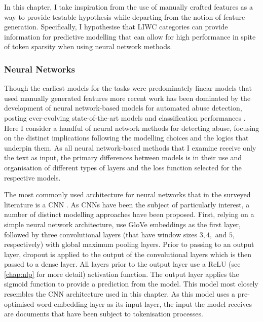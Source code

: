 In this chapter, I take inspiration from the use of manually crafted features as a way to provide testable hypothesis while departing from the notion of feature generation.  
Specifically, I hypothesise that LIWC categories can provide information for predictive modelling that can allow for high performance in spite of token sparsity when using neural network methods.  
  
\subsubsection{Neural Networks}\label{sec:LIWC_nn}  
Though the earliest models for the tasks were predominately linear models that used manually generated features \citep{Waseem-Hovy:2016,Davidson:2017,Warner:2012} more recent work has been dominated by the development of neural network-based models for automated abuse detection, posting ever-evolving state-of-the-art models and classification performances \citep[e.g.]{Park:2017,Badjatiya:2017,Zimmerman:2018,Stoop:2019,Isaksen:2020}.  
Here I consider a handful of neural network methods for detecting abuse, focusing on the distinct implications following the modelling choices and the logics that underpin them.  
As all neural network-based methods that I examine receive only the text as input, the primary differences between  models is in their use and organisation of different types of layers and the loss function selected for the respective models.  
  
The most commonly used architecture for neural networks that in the surveyed literature is a CNN \citep{Park:2017,Gamback:2017,Wulczyn:2017,Kolhatkar:2020,Zimmerman:2018,Wang:2020}.  
As CNNs have been the subject of particularly interest, a number of distinct modelling approaches have been proposed.  
First, relying on a simple neural network architecture, \citet{Kolhatkar:2020} use GloVe embeddings as the first layer, followed by three convolutional layers (that have window sizes $3, 4,$ and $5$, respectively) with global maximum pooling layers.  
Prior to passing  to an output layer,  dropout  is applied to the output of the convolutional layers which is then passed to a dense layer.  
All layers prior to the output layer use a ReLU (see \cref{chap:nlp} for more detail) activation function.  
The output layer applies the sigmoid function to provide a prediction from the model.  
This model most closely resembles the CNN architecture used in this chapter.  
As this model uses a pre-optimised word-embedding layer as its input layer, the input the model receives are documents that have been subject to tokenisation processes.  
  
